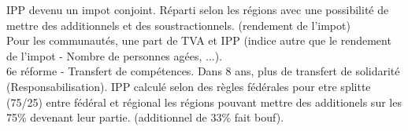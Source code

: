 \documentclass{book}
\begin{document}
IPP devenu un impot conjoint. Réparti selon les régions avec une possibilité de mettre des additionnels et des soustractionnels. (rendement de l'impot)\\

Pour les communautés, une part de TVA et IPP (indice autre que le rendement de l'impot - Nombre de personnes agées, ...).\\


6e réforme - Transfert de compétences. Dans 8 ans, plus de transfert de solidarité (Responsabilisation). IPP calculé selon des règles fédérales pour etre splitte (75/25) entre fédéral et régional les régions pouvant mettre des additionels sur les 75\% devenant leur partie. (additionnel de 33\% fait bouf). 


\nocite{*}

\end{document}
